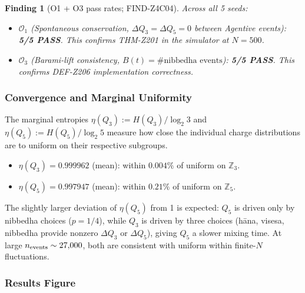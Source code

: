 \documentclass[12pt, a4paper]{article}
\newtheorem{finding}{Finding}[section]
\begin{document}
\begin{finding}[O1 + O3 pass rates; FIND-Z4C04]
Across all 5 seeds:
\begin{itemize}[leftmargin=*, noitemsep]
  \item $\mathcal{O}_1$ (Spontaneous conservation,
    $\Delta Q_3 = \Delta Q_5 = 0$ between Agentive events):
    \textbf{5/5 PASS}.
    This confirms THM-Z201 in the simulator at $N=500$.
  \item $\mathcal{O}_3$ (Barami-lift consistency,
    $B(t) = \#\text{nibbedha events}$):
    \textbf{5/5 PASS}.
    This confirms DEF-Z206 implementation correctness.
\end{itemize}
\end{finding}

\subsubsection{Convergence and Marginal Uniformity}

The marginal entropies $\eta(Q_3) := H(Q_3)/\log_2 3$ and
$\eta(Q_5) := H(Q_5)/\log_2 5$ measure how close the individual
charge distributions are to uniform on their respective subgroups.

\begin{itemize}[leftmargin=*]
  \item $\eta(Q_3) = 0.999962$ (mean): within $0.004\%$ of uniform
    on $\mathbb{Z}_3$.
  \item $\eta(Q_5) = 0.997947$ (mean): within $0.21\%$ of uniform
    on $\mathbb{Z}_5$.
\end{itemize}

The slightly larger deviation of $\eta(Q_5)$ from 1 is expected:
$Q_5$ is driven only by nibbedha choices ($p = 1/4$), while $Q_3$
is driven by three choices (hāna, visesa, nibbedha provide nonzero
$\Delta Q_3$ or $\Delta Q_5$), giving $Q_5$ a slower mixing time.
At large $n_{\rm events} \sim 27{,}000$, both are consistent with
uniform within finite-$N$ fluctuations.

\subsubsection{Results Figure}
\end{document}
